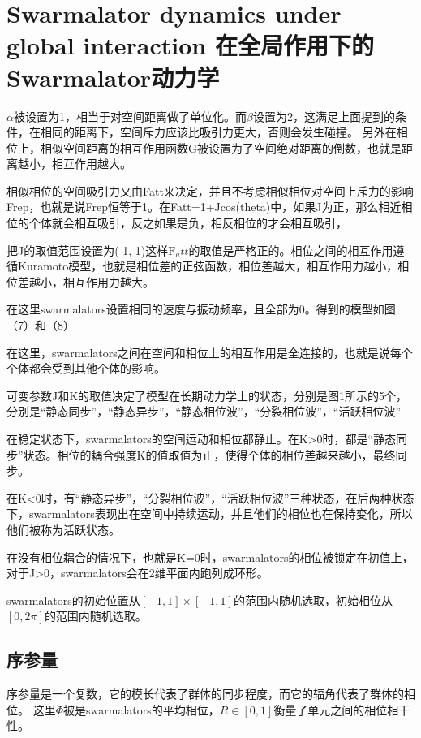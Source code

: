 \documentclass[12pt, oneside]{ctexbook}
\begin{document}
\section{Swarmalator dynamics under global interaction \newline 在全局作用下的Swarmalator动力学}

    
{\noindent 
$\alpha$被设置为1，相当于对空间距离做了单位化。而$\beta$设置为2，这满足上面提到的条件，在相同的距离下，空间斥力应该比吸引力更大，否则会发生碰撞。
}
另外在相位上，相似空间距离的相互作用函数G被设置为了空间绝对距离的倒数，也就是距离越小，相互作用越大。

相似相位的空间吸引力又由Fatt来决定，并且不考虑相似相位对空间上斥力的影响Frep，也就是说Frep恒等于1。在Fatt=1+Jcos(theta)中，如果J为正，那么相近相位的个体就会相互吸引，反之如果是负，相反相位的才会相互吸引，

把J的取值范围设置为(-1, 1)这样$\mathrm{F}_att$的取值是严格正的。相位之间的相互作用遵循Kuramoto模型，也就是相位差的正弦函数，相位差越大，相互作用力越小，相位差越小，相互作用力越大。

在这里swarmalators设置相同的速度与振动频率，且全部为0。得到的模型如图（7）和（8）

在这里，swarmalators之间在空间和相位上的相互作用是全连接的，也就是说每个个体都会受到其他个体的影响。

可变参数J和K的取值决定了模型在长期动力学上的状态，分别是图1所示的5个，分别是“静态同步”，“静态异步”，“静态相位波”，“分裂相位波”，“活跃相位波”

在稳定状态下，swarmalators的空间运动和相位都静止。在K>0时，都是“静态同步”状态。相位的耦合强度K的值取值为正，使得个体的相位差越来越小，最终同步。

在K<0时，有“静态异步”，“分裂相位波”，“活跃相位波”三种状态，在后两种状态下，swarmalators表现出在空间中持续运动，并且他们的相位也在保持变化，所以他们被称为活跃状态。

在没有相位耦合的情况下，也就是K=0时，swarmalators的相位被锁定在初值上，对于J>0，swarmalators会在2维平面内跑列成环形。

swarmalators的初始位置从$[-1, 1]\times[-1, 1]$的范围内随机选取，初始相位从$[0, 2\pi]$的范围内随机选取。

\subsection{序参量}

序参量是一个复数，它的模长代表了群体的同步程度，而它的辐角代表了群体的相位。
这里$\Phi$被是swarmalators的平均相位，$R\in \left[ 0, 1 \right]$衡量了单元之间的相位相干性。
\end{document}
